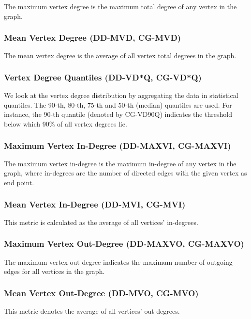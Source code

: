 \documentclass{scrartcl}
\begin{document}
The maximum vertex degree is the maximum total degree of any vertex in the
graph.

\subsubsection{Mean Vertex Degree (DD-MVD, CG-MVD)}

The mean vertex degree is the average of all vertex total degrees in the graph.

\subsubsection{Vertex Degree Quantiles (DD-VD*Q, CG-VD*Q)}

We look at the vertex degree distribution by aggregating the data in statistical
quantiles. The 90-th, 80-th, 75-th and 50-th (median) quantiles are used. For
instance, the 90-th quantile (denoted by CG-VD90Q) indicates the threshold
below which 90\% of all vertex degrees lie.

\subsubsection{Maximum Vertex In-Degree (DD-MAXVI, CG-MAXVI)}

The maximum vertex in-degree is the maximum in-degree of any vertex in the
graph, where in-degrees are the number of directed edges with the given vertex
as end point.

\subsubsection{Mean Vertex In-Degree (DD-MVI, CG-MVI)}

This metric is calculated as the average of all vertices' in-degrees.

\subsubsection{Maximum Vertex Out-Degree (DD-MAXVO, CG-MAXVO)}

The maximum vertex out-degree indicates the maximum number of outgoing edges for
all vertices in the graph.

\subsubsection{Mean Vertex Out-Degree (DD-MVO, CG-MVO)}

This metric denotes the average of all vertices' out-degrees.
\end{document}
